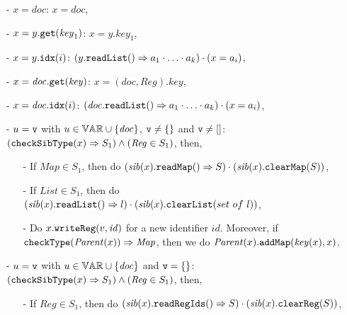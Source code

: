 \begin{itemize}
\setlength{\itemsep}{0.5pt}
\item[-] $x = \mathit{doc}$: $x = \mathit{doc}$,

\item[-] $x = y.{\tt get}(\mathit{key}_1)$: $x = y.\mathit{key}_1$,

\item[-] $x = y.{\tt idx}(i)$: $(y.{\tt readList}()\Rightarrow a_1 \cdot \ldots \cdot a_k) \cdot (x = a_i)$,

\item[-] $x = \mathit{doc}.{\tt get}(\mathit{key})$: $x = (\mathit{doc},\mathit{Reg}).\mathit{key}$,

\item[-] $x = \mathit{doc}.{\tt idx}(i)$: $(\mathit{doc}.{\tt readList}()\Rightarrow a_1 \cdot \ldots \cdot a_k) \cdot (x = a_i)$,

\item[-] $u = \mathtt{v}$ with $u \in \mathbb{VAR} \cup \{ \mathit{doc} \}$, $\mathtt{v} \neq \{\}$ and $\mathtt{v} \neq []$: $({\tt checkSibType}(x) \Rightarrow S_1) \wedge ( \mathit{Reg} \in S_1 )$, then,

    \begin{itemize}
    \setlength{\itemsep}{0.5pt}
    \item[-] If $\mathit{Map} \in S_1$, then do $( \mathit{sib}(x).{\tt readMap}()\Rightarrow S ) \cdot ( \mathit{sib}(x).{\tt clearMap}(S) )$,

    \item[-] If $\mathit{List} \in S_1$, then do $( \mathit{sib}(x).{\tt readList}()\Rightarrow l ) \cdot ( \mathit{sib}(x).{\tt clearList}(set \ of \ l) )$,

    \item[-] Do $x.{\tt writeReg}(v,\mathit{id})$ for a new identifier $\mathit{id}$. Moreover, if ${\tt checkType}(\mathit{Parent}(x))\Rightarrow \mathit{Map}$, then we do $\mathit{Parent}(x).{\tt addMap}(\mathit{key}(x),x)$. 
    \end{itemize}

\item[-] $u = \mathtt{v}$ with $u \in \mathbb{VAR} \cup \{ \mathit{doc} \}$ and $\mathtt{v} = \{\}$: $({\tt checkSibType}(x) \Rightarrow S_1) \wedge ( \mathit{Reg} \in S_1 )$, then,

    \begin{itemize}
    \setlength{\itemsep}{0.5pt}
    \item[-] If $\mathit{Reg} \in S_1$, then do $( \mathit{sib}(x).{\tt readRegIds}()\Rightarrow S ) \cdot ( \mathit{sib}(x).{\tt clearReg}(S) )$,


\end{itemize}
\end{itemize}

